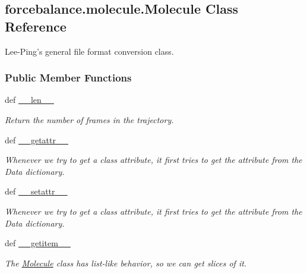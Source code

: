 \hypertarget{classforcebalance_1_1molecule_1_1Molecule}{\subsection{forcebalance.\-molecule.\-Molecule \-Class \-Reference}
\label{classforcebalance_1_1molecule_1_1Molecule}
}


\-Lee-\/\-Ping's general file format conversion class.  


\subsubsection*{\-Public \-Member \-Functions}
\begin{DoxyCompactItemize}
\item 
def \hyperlink{classforcebalance_1_1molecule_1_1Molecule_a619d265b8c438f9ad87ac536e66ea9a0}{\-\_\-\-\_\-len\-\_\-\-\_\-}
\begin{DoxyCompactList}\small\item\em \-Return the number of frames in the trajectory. \end{DoxyCompactList}\item 
def \hyperlink{classforcebalance_1_1molecule_1_1Molecule_a0c40cab05311928494dae9278e806240}{\-\_\-\-\_\-getattr\-\_\-\-\_\-}
\begin{DoxyCompactList}\small\item\em \-Whenever we try to get a class attribute, it first tries to get the attribute from the \-Data dictionary. \end{DoxyCompactList}\item 
def \hyperlink{classforcebalance_1_1molecule_1_1Molecule_a3e716bb5d0b0450d5774cfc42a44c789}{\-\_\-\-\_\-setattr\-\_\-\-\_\-}
\begin{DoxyCompactList}\small\item\em \-Whenever we try to get a class attribute, it first tries to get the attribute from the \-Data dictionary. \end{DoxyCompactList}\item 
def \hyperlink{classforcebalance_1_1molecule_1_1Molecule_a0da69575f235955e5562e46d311a5536}{\-\_\-\-\_\-getitem\-\_\-\-\_\-}
\begin{DoxyCompactList}\small\item\em \-The \hyperlink{classforcebalance_1_1molecule_1_1Molecule}{\-Molecule} class has list-\/like behavior, so we can get slices of it. \end{DoxyCompactList}\item 

\end{DoxyCompactItemize}
